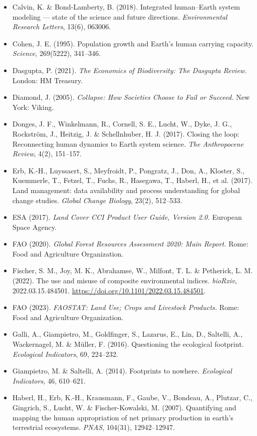 \documentclass[11pt]{article}
\begin{document}
\begin{itemize}
\item Calvin, K. \& Bond-Lamberty, B. (2018). Integrated human--Earth system modeling --- state of the science and future directions. \emph{Environmental Research Letters}, 13(6), 063006.
\item Cohen, J. E. (1995). Population growth and Earth's human carrying capacity. \emph{Science}, 269(5222), 341--346.
\item Dasgupta, P. (2021). \emph{The Economics of Biodiversity: The Dasgupta Review.} London: HM Treasury.
\item Diamond, J. (2005). \emph{Collapse: How Societies Choose to Fail or Succeed.} New York: Viking.
\item Donges, J. F., Winkelmann, R., Cornell, S. E., Lucht, W., Dyke, J. G., Rockstr\"om, J., Heitzig, J. \& Schellnhuber, H. J. (2017). Closing the loop: Reconnecting human dynamics to Earth system science. \emph{The Anthropocene Review}, 4(2), 151--157.
\item Erb, K.-H., Luyssaert, S., Meyfroidt, P., Pongratz, J., Don, A., Kloster, S., Kuemmerle, T., Fetzel, T., Fuchs, R., Hasegawa, T., Haberl, H., et al. (2017). Land management: data availability and process understanding for global change studies. \emph{Global Change Biology}, 23(2), 512--533.
\item ESA (2017). \emph{Land Cover CCI Product User Guide, Version 2.0.} European Space Agency.
\item FAO (2020). \emph{Global Forest Resources Assessment 2020: Main Report.} Rome: Food and Agriculture Organization.
\item Fischer, S. M., Joy, M. K., Abrahamse, W., Milfont, T. L. \& Petherick, L. M. (2022). The use and misuse of composite environmental indices. \emph{bioRxiv}, 2022.03.15.484501. \url{https://doi.org/10.1101/2022.03.15.484501}.
\item FAO (2023). \emph{FAOSTAT: Land Use; Crops and Livestock Products.} Rome: Food and Agriculture Organization.
\item Galli, A., Giampietro, M., Goldfinger, S., Lazarus, E., Lin, D., Saltelli, A., Wackernagel, M. \& M\"uller, F. (2016). Questioning the ecological footprint. \emph{Ecological Indicators}, 69, 224--232.
\item Giampietro, M. \& Saltelli, A. (2014). Footprints to nowhere. \emph{Ecological Indicators}, 46, 610--621.
\item Haberl, H., Erb, K.-H., Krausmann, F., Gaube, V., Bondeau, A., Plutzar, C., Gingrich, S., Lucht, W. \& Fischer-Kowalski, M. (2007). Quantifying and mapping the human appropriation of net primary production in earth's terrestrial ecosystems. \emph{PNAS}, 104(31), 12942--12947.

\end{itemize}
\end{document}

